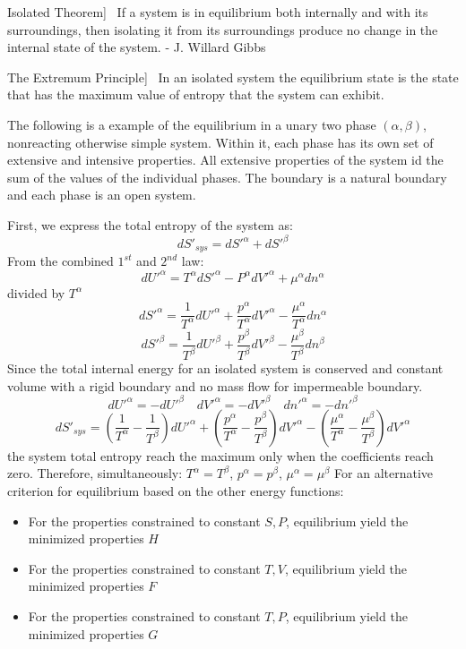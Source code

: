 \documentclass[UTF8]{book}
\newenvironment{theorem}[2][Theorem]{\begin{trivlist}
\item[\hskip \labelsep {\bfseries #1}\hskip \labelsep {\bfseries }]}{\end{trivlist}}
\begin{document}
\begin{theorem}
[Isolated Theorem]~  {If a system is in equilibrium both internally and with its surroundings, then isolating it from its surroundings produce no change in the internal state of the system. - J. Willard Gibbs}
\end{theorem}

\begin{theorem}
[The Extremum Principle]~  {In an isolated system the equilibrium state is the state that has the maximum value of entropy that the system can exhibit.}
\end{theorem}

 {The following is a example of the equilibrium in a unary two phase $(\alpha , \beta)$, nonreacting otherwise simple system. Within it, each phase has its own set of extensive and intensive properties. All extensive properties of the system id the sum of the values of the individual phases. The boundary is a natural boundary and each phase is an open system.}
 
 {First, we express the total entropy of the system as:}
$$dS'_{sys}=dS'^\alpha +dS'^\beta $$
 {From the combined $1^{st}$ and $2^{nd}$ law:}
$$dU'^\alpha =T^\alpha dS'^\alpha -P^\alpha dV'^\alpha +\mu ^\alpha dn^\alpha $$
 {divided by $T^\alpha $}
$$dS'^\alpha =\dfrac{1}{T^\alpha }dU'^\alpha +\dfrac{p^\alpha }{T^\alpha }dV'^\alpha -\dfrac{\mu ^\alpha }{T^\alpha }dn^\alpha $$
$$dS'^\beta  =\dfrac{1}{T^\beta }dU'^\beta +\dfrac{p^\beta }{T^\beta }dV'^\beta -\dfrac{\mu ^\beta }{T^\beta }dn^\beta $$
 {Since the total internal energy for an isolated system is conserved and constant volume with a rigid boundary and no mass flow for impermeable boundary.}
$$dU'^\alpha=-dU'^\beta \quad dV'^\alpha=-dV'^\beta \quad dn'^\alpha=-dn'^\beta $$
$$dS'_{sys}=\left(\dfrac{1}{T^\alpha }-\dfrac{1}{T^\beta }\right)dU'^\alpha+\left(\dfrac{p^\alpha }{T^\alpha }-\dfrac{p^\beta }{T^\beta }\right)dV'^\alpha-\left(\dfrac{\mu ^\alpha }{T^\alpha }-\dfrac{\mu ^\beta }{T^\beta }\right)dV'^\alpha $$
 {the system total entropy reach the maximum only when the coefficients reach zero. Therefore, simultaneously: $T^\alpha =T^\beta $, $p^\alpha =p^\beta $, $\mu ^\alpha =\mu ^\beta $}
 {For an alternative criterion for equilibrium based on the other energy functions: }
\begin{itemize}
\item  {For the properties constrained to constant $S,P$, equilibrium yield the minimized properties $H$}
\item  {For the properties constrained to constant $T,V$, equilibrium yield the minimized properties $F$}
\item  {For the properties constrained to constant $T,P$, equilibrium yield the minimized properties $G$}
\end{itemize}
\end{document}
